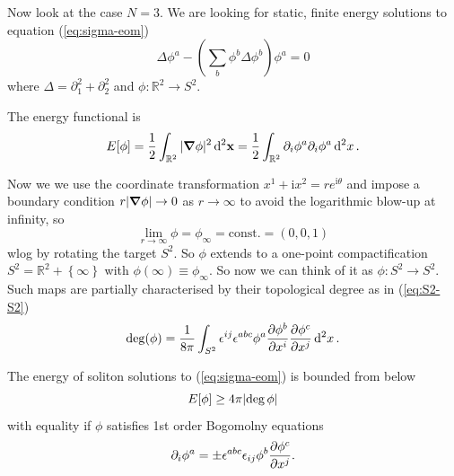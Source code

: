 \documentclass[a4paper,11pt]{article}
\begin{document}
    Now look at the case $N=3$. We are looking for static, finite energy solutions to equation (\ref{eq:sigma-eom})
    \begin{equation}
        \Delta \phi^a - \left( \sum_b \phi^b \Delta \phi^b \right) \phi^a = 0
    \end{equation}
    where $\Delta = \partial_1^2 + \partial_2^2$ and $\phi: \mathbb{R}^2 \to S^2$.

    The energy functional is 
    \begin{equation}
        E[\phi] = \frac{1}{2} \int_{\mathbb{R}^2} |\grad \phi|^2 \dd[2]{\vb x} = \frac{1}{2} \int_{\mathbb{R}^2} \partial_i \phi^a \partial_i \phi^a \dd[2]{x}.
    \end{equation}

    Now we we use the coordinate transformation $x^1 + \mathrm{i} x^2 = r e^{\mathrm{i} \theta}$ and impose a boundary condition $r|\grad \phi| \to 0$ as $r \to \infty$ to avoid the logarithmic blow-up at infinity, so 
    \begin{equation}
        \lim_{r \to \infty} \phi = \phi_\infty = \text{const.} = (0,0,1)
    \end{equation}
    wlog by rotating the target $S^2$. So $\phi$ extends to a one-point compactification $S^2 = \mathbb{R}^2 + \left\{ \infty \right\}$ with $\phi(\infty) \equiv \phi_\infty$. So now we can think of it as $\phi : S^2 \to S^2$. Such maps are partially characterised by their topological degree as in (\ref{eq:S2-S2})
    \begin{equation}
        \deg(\phi) = \frac{1}{8 \pi} \int_{S^2} \epsilon^{ij} \epsilon^{abc} \phi^a \pdv{\phi^b}{x^i} \pdv{\phi^c}{x^j} \dd[2]{x}.
    \end{equation}

    \begin{thm}
        The energy of soliton solutions to (\ref{eq:sigma-eom}) is bounded from below 
        \begin{equation}
            E[\phi] \geq 4 \pi \abs{\deg{\phi}}
        \end{equation}
        with equality if $\phi$ satisfies 1st order Bogomolny equations
        \begin{equation}
            \partial_i \phi^a = \pm \epsilon^{abc} \epsilon_{ij} \phi^b \pdv{\phi^c}{x^j}. \label{eq:NLSM-Bogo}
        \end{equation}
    \end{thm}
\end{document}

